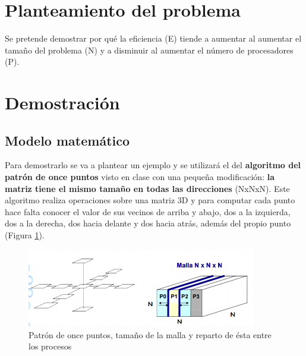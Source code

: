 \newpage %

\tableofcontents %

\listoffigures

\newpage


\section{Planteamiento del problema}

Se pretende demostrar por qué la eficiencia (E) tiende a aumentar al aumentar el tamaño del problema (N) y a disminuir al aumentar el número de procesadores (P).

\section{Demostración}

\subsection{Modelo matemático}

Para demostrarlo se va a plantear un ejemplo y se utilizará el del \textbf{algoritmo del patrón de once puntos} visto en clase con una pequeña modificación: \textbf{la matriz tiene el mismo tamaño en todas las direcciones} (NxNxN). Este algoritmo realiza operaciones sobre una matriz 3D y para computar cada punto hace falta conocer el valor de sus vecinos de arriba y abajo, dos a la izquierda, dos a la derecha, dos hacia delante y dos hacia atrás, además del propio punto (Figura \ref{fig:oncePuntos}).

\begin{figure}[H]
	\centering
	\includegraphics[width=10cm]{imagenes/oncePuntos}
	\caption{Patrón de once puntos, tamaño de la malla y reparto de ésta entre los procesos}
	\label{fig:oncePuntos}
\end{figure}

